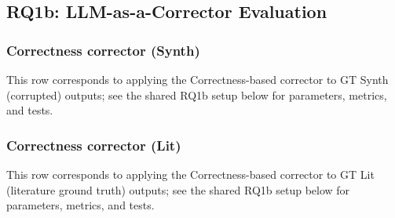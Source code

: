 \subsection{RQ1b: LLM-as-a-Corrector Evaluation}
\label{sec:rq1b}
\label{sec:rq1b_experiments}

\subsubsection{Correctness corrector (Synth)}\label{sec:rq1b_corrector_synth}
\noindent This row corresponds to applying the Correctness-based corrector to GT Synth (corrupted) outputs; see the shared RQ1b setup below for parameters, metrics, and tests.

\subsubsection{Correctness corrector (Lit)}\label{sec:rq1b_corrector_lit}
\noindent This row corresponds to applying the Correctness-based corrector to GT Lit (literature ground truth) outputs; see the shared RQ1b setup below for parameters, metrics, and tests.

